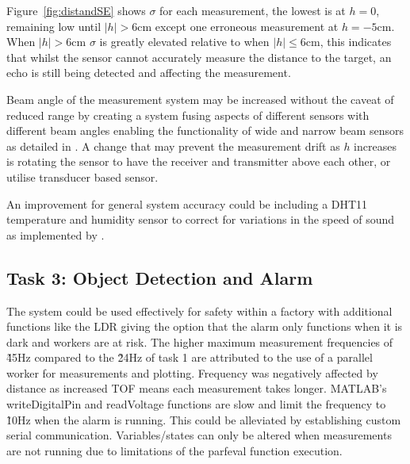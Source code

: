 \documentclass[a4paper,12pt]{article}
\begin{document}
 Figure~\ref{fig:distandSE} shows $\sigma$ for each measurement, the lowest is at $h=0$, remaining low until $|h|>6$cm except one erroneous measurement at $h=-5$cm. When $|h|>6$cm $\sigma$ is greatly elevated relative to when $|h|\leq6$cm, this indicates that whilst the sensor cannot accurately measure the distance to the target, an echo is still being detected and affecting the measurement. 

Beam angle of the measurement system may be increased without the caveat of reduced range by creating a system fusing aspects of different sensors with different beam angles enabling the functionality of wide and narrow beam sensors as detailed in \cite{4388569}. A change that may prevent the measurement drift as $h$ increases is rotating the sensor to have the receiver and transmitter above each other, or utilise transducer based sensor.

An improvement for general system accuracy could be including a DHT11 temperature and humidity sensor to correct for variations in the speed of sound as implemented by \cite{Berger2023}.

\subsection{Task 3: Object Detection and Alarm}
The system could be used effectively for safety within a factory with additional functions like the LDR giving the option that the alarm only functions when it is dark and workers are at risk.
The higher maximum measurement frequencies of \~45Hz compared to the \~24Hz of task 1 are attributed to the use of a parallel worker for measurements and plotting. Frequency was negatively affected by distance as increased TOF means each measurement takes longer. MATLAB's writeDigitalPin and readVoltage functions are slow and limit the frequency to \~10Hz when the alarm is running. This could be alleviated by establishing custom serial communication. Variables/states can only be altered when measurements are not running due to limitations of the parfeval function execution.
\end{document}
